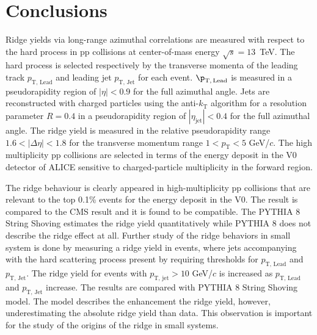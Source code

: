 
\section{Conclusions}
\label{sec:summary}




Ridge yields via long-range azimuthal correlations are measured with respect to the hard process in pp collisions at center-of-mass energy $\sqrt{s} = 13$~TeV.
The hard process is selected respectively by the transverse momenta of the leading track $p_\mathrm{T,\,Lead}$ and leading jet $p_\mathrm{T,\,Jet}$ for each event. $\p_\mathrm{T,\,Lead}$ is measured in a pseudorapidity region of $|\eta|<0.9$ for the full azimuthal angle. Jets are reconstructed with charged particles using the anti-$k_\mathrm{T}$ algorithm for a resolution parameter $R=0.4$ in a pseudorapidity region of $|\eta_\mathrm{jet}|<0.4$ for the full azimuthal angle. 
The ridge yield is measured in the relative pseudorapidity range $1.6 < |\Delta\eta| < 1.8$ for the transverse momentum range $1 < p_\mathrm{T} < 5$ GeV/$c$. The high multiplicity pp collisions are selected in terms of the energy deposit in the V0 detector of ALICE sensitive to charged-particle multiplicity in the forward region. 

The ridge behaviour is clearly appeared in high-multiplicity pp collisions that are relevant to the top 0.1\% events for the energy deposit in the V0. The result is compared to the CMS result and it is found to be compatible. The PYTHIA 8 String Shoving estimates the ridge yield quantitatively while PYTHIA 8 does not describe the ridge effect at all. Further study of the ridge behaviors in small system is done by measuring a ridge yield in events, where jets accompanying with the hard scattering process present by requiring thresholds for $p_\mathrm{T,\,Lead}$ and $p_\mathrm{T,\,Jet}$. The ridge yield for events with $p_\mathrm{T,\,jet} > 10$ GeV/$c$ is increased as $p_\mathrm{T,\,Lead}$ and $p_\mathrm{T,\,Jet}$ increase. The results are compared with PYTHIA 8 String Shoving model. The model describes the enhancement the ridge yield, however, underestimating the absolute ridge yield than data. This observation is important for the study of the origins of the ridge in small systems.

